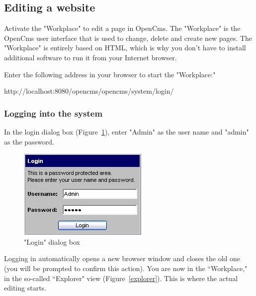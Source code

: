 \subsection{Editing a website}

Activate the "Workplace" to edit a page in OpenCms. The
"Workplace" is the OpenCms user interface that is used to change,
delete and create new pages. The "Workplace" is entirely based on
HTML, which is why you don't have to install additional software
to run it from your Internet browser.

Enter the following address in your browser to start the
"Workplace:"

http://localhost:8080/opencms/opencms/system/login/

\subsubsection{Logging into the system}

In the login dialog box (Figure~\ref{loginbox}), enter "Admin" as
the user name and "admin" as the password.

\begin{figure}[!hbt]
\begin{minipage}[b]{0.35\linewidth}
   \begin{center}
\includegraphics[width=\sgw]
                   {pics/usermanual/loginBox}
\caption["Login" dialog box]
           {"Login" dialog box}
\label{loginbox}
   \end{center}
\end{minipage}
\hfill
\end{figure}

Logging in automatically opens a new browser window and closes the
old one (you will be prompted to confirm this action). You are now
in the ``Workplace," in the so-called ``Explorer" view
(Figure~\ref{explorer}). This is where the actual editing starts.

